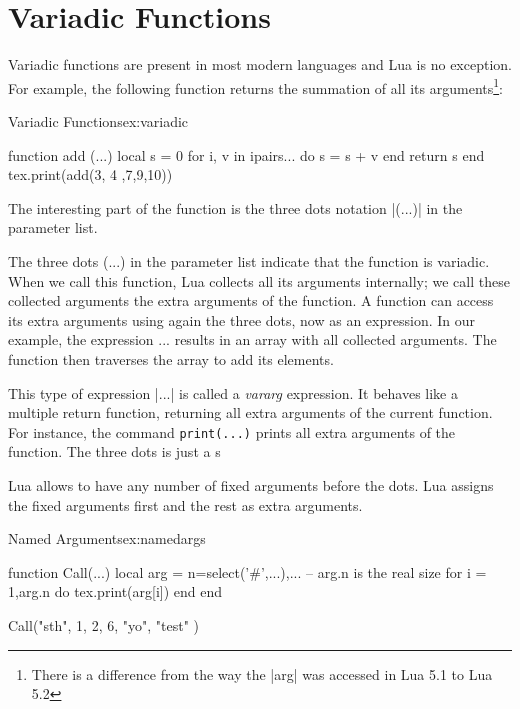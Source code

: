 \chapter{Variadic Functions}

Variadic functions are present in most modern languages and Lua is no exception. For example, the following function returns the summation of all its arguments\footnote{There is a difference from the way the |arg| was accessed in Lua 5.1 to Lua 5.2}:

\begin{texexample}{Variadic Functions}{ex:variadic}
\begin{luacode*}
function add (...)
	local s = 0
	for i, v in ipairs{...} do
   		s = s + v
	end
	return s
end
tex.print(add(3, 4 ,7,9,10))
\end{luacode*}
\end{texexample}

The interesting part of the function is the three dots notation |(...)| in the parameter list.

The three dots (...) in the parameter list indicate that the function is variadic.
When we call this function, Lua collects all its arguments internally; we call
these collected arguments the extra arguments of the function. A function can
access its extra arguments using again the three dots, now as an expression.
In our example, the expression {...} results in an array with all collected
arguments. The function then traverses the array to add its elements.

This type of  expression |...| is called  a \emph{vararg} expression. It behaves like a multiple
return function, returning all extra arguments of the current function. For
instance, the command \texttt{print(...)} prints all extra arguments of the function. The three dots is just a s

Lua allows to have any number of fixed arguments before the dots. Lua assigns the fixed arguments first and the rest as extra arguments.

\begin{texexample}{Named Arguments}{ex:namedargs}
\begin{luacode*}
function Call(...)
   local arg = {n=select('#',...),...}
  -- arg.n is the real size
  for i = 1,arg.n do
    tex.print(arg[i])
  end
 end

Call("sth", 1, 2, 6, "yo", "test" )	

\end{luacode*}
\end{texexample}


